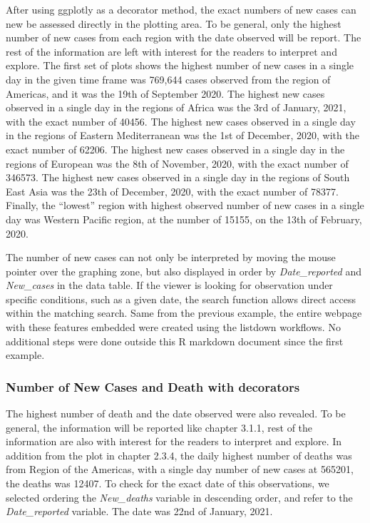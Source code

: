 \documentclass[
]{article}
\begin{document}
After using ggplotly as a decorator method, the exact numbers of new
cases can new be assessed directly in the plotting area. To be general,
only the highest number of new cases from each region with the date
observed will be report. The rest of the information are left with
interest for the readers to interpret and explore. The first set of
plots shows the highest number of new cases in a single day in the given
time frame was 769,644 cases observed from the region of Americas, and
it was the 19th of September 2020. The highest new cases observed in a
single day in the regions of Africa was the 3rd of January, 2021, with
the exact number of 40456. The highest new cases observed in a single
day in the regions of Eastern Mediterranean was the 1st of December,
2020, with the exact number of 62206. The highest new cases observed in
a single day in the regions of European was the 8th of November, 2020,
with the exact number of 346573. The highest new cases observed in a
single day in the regions of South East Asia was the 23th of December,
2020, with the exact number of 78377. Finally, the ``lowest'' region
with highest observed number of new cases in a single day was Western
Pacific region, at the number of 15155, on the 13th of February, 2020.

The number of new cases can not only be interpreted by moving the mouse
pointer over the graphing zone, but also displayed in order by
\emph{Date\_reported} and \emph{New\_cases} in the data table. If the
viewer is looking for observation under specific conditions, such as a
given date, the search function allows direct access within the matching
search. Same from the previous example, the entire webpage with these
features embedded were created using the listdown workflows. No
additional steps were done outside this R markdown document since the
first example.

\hypertarget{number-of-new-cases-and-death-with-decorators}{%
\subsubsection{Number of New Cases and Death with
decorators}\label{number-of-new-cases-and-death-with-decorators}}

The highest number of death and the date observed were also revealed. To
be general, the information will be reported like chapter 3.1.1, rest of
the information are also with interest for the readers to interpret and
explore. In addition from the plot in chapter 2.3.4, the daily highest
number of deaths was from Region of the Americas, with a single day
number of new cases at 565201, the deaths was 12407. To check for the
exact date of this observations, we selected ordering the
\emph{New\_deaths} variable in descending order, and refer to the
\emph{Date\_reported} variable. The date was 22nd of January, 2021.
\end{document}
